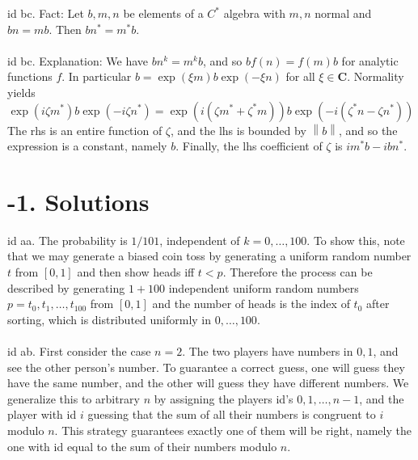 \documentclass[oneside]{book}
\newcommand{\C}{\mathbf{C}}
\newcommand{\norm}[1]{\left\lVert #1\right\rVert}
\newcommand{\str}{^*}
\newcommand\chap[1]{%
  \chapter*{#1}%
  \addcontentsline{toc}{chapter}{#1}}
\begin{document}
id bc. Fact: Let $b,m,n$ be elements of a $C\str$ algebra with $m,n$ normal and $bn=mb$. Then $bn\str=m\str b$. \\\\


id bc. Explanation: We have $bn^k=m^kb$, and so $bf(n)=f(m)b$ for analytic functions $f$. In particular $b=\exp(\xi m)b\exp(-\xi n)$ for all $\xi\in\C$. Normality yields
$$\exp(i\zeta m\str)b\exp(-i\zeta n\str) = \exp(i(\zeta m\str + \zeta\str m))b\exp(-i(\zeta^* n-\zeta n\str))$$
The rhs is an entire function of $\zeta$, and the lhs is bounded by $\norm{b}$, and so the expression is a constant, namely $b$. Finally, the lhs coefficient of $\zeta$ is $im\str b-ibn\str$.

\newpage
\chap{-1. Solutions}
id aa. The probability is $1/101$, independent of $k=0,\dots,100$. To show this, note that we may generate a biased coin toss by generating a uniform random number $t$ from $[0,1]$ and then show heads iff $t<p$. Therefore the process can be described by generating $1+100$ independent uniform random numbers $p=t_0,t_1,\dots,t_{100}$ from $[0,1]$ and the number of heads is the index of $t_0$ after sorting, which is distributed uniformly in $0,\dots,100$.  \\\\


id ab. First consider the case $n=2$. The two players have numbers in $0,1$, and see the other person's number. To guarantee a correct guess, one will guess they have the same number, and the other will guess they have different numbers. We generalize this to arbitrary $n$ by assigning the players id's $0,1,\dots,n-1$, and the player with id $i$ guessing that the sum of all their numbers is congruent to $i$ modulo $n$. This strategy guarantees exactly one of them will be right, namely the one with id equal to the sum of their numbers modulo $n$.     \\\\
\end{document}
